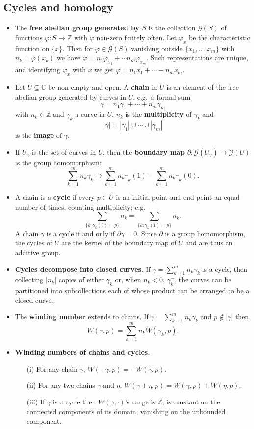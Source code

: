 \documentclass{article}
\newenvironment{topic}[1]{%
{\subsection{#1}}%
\begin{itemize}%
}{%
\end{itemize}%
}
\newcommand{\theorem}[1]{\item {\bf #1.}}
\newcommand{\term}[1]{{\bf #1}}
\newcommand{\remark}{\item}
\begin{document}
\begin{topic}{Cycles and homology}

\remark The \term{free abelian group generated by $S$} is the collection $\mathcal{G}(S)$ of functions $\varphi : S \to \mathbb{Z}$ with $\varphi$ non-zero finitely often. Let $\varphi_x$ be the characteristic function on $\{x\}$. Then for $\varphi \in \mathcal{G}(S)$ vanishing outside $\{x_1, \ldots, x_m\}$ with $n_k = \varphi(x_k)$ we have $\varphi = n_1 \varphi_{x_1} + \cdots n_m \varphi_{x_m}$. Such representations are unique, and identifying $\varphi_x$ with $x$ we get $\varphi = n_1 x_1 + \cdots + n_m x_m$.

\remark Let $U \subseteq \mathbb{C}$ be non-empty and open. A \term{chain} in $U$ is an element of the free abelian group generated by curves in $U$, e.g.\ a formal sum $$\gamma = n_1 \gamma_1 + \cdots + n_m \gamma_m$$ with $n_k \in \mathbb{Z}$ and $\gamma_k$ a curve in $U$. $n_k$ is the \term{multiplicity} of $\gamma_k$ and $$|\gamma| = |\gamma_1| \cup \cdots \cup |\gamma_m|$$ is the \term{image} of $\gamma$.

\remark If $U_\gamma$ is the set of curves in $U$, then the \term{boundary map} $\partial : \mathcal{G}(U_\gamma) \to \mathcal{G}(U)$ is the group homomorphism:
$$\sum_{k=1}^m n_k \gamma_k \mapsto \sum_{k=1}^m n_k \gamma_k(1) - \sum_{k=1}^m n_k \gamma_k(0).$$

\remark A chain is a \term{cycle} if every $p \in U$ is an initial point and end point an equal number of times, counting multiplicity; e.g. $$\sum_{\{k:\gamma_k(0)=p\}} n_k = \sum_{\{k:\gamma_k(1)=p\}} n_k.$$ A chain $\gamma$ is a cycle if and only if $\partial\gamma = 0$. Since $\partial$ is a group homomorphism, the cycles of $U$ are the kernel of the boundary map of $U$ and are thus an additive group.

\theorem{Cycles decompose into closed curves} If $\gamma = \sum_{k=1}^m n_k \gamma_k$ is a cycle, then collecting $|n_k|$ copies of either $\gamma_k$ or, when $n_k < 0$, $\gamma_k^-$, the curves can be partitioned into subcollections each of whose product can be arranged to be a closed curve.

\remark The \term{winding number} extends to chains. If $\gamma = \sum_{k=1}^m n_k \gamma_k$ and $p \not\in |\gamma|$ then $$W(\gamma, p) = \sum_{k=1}^m n_k W(\gamma_k, p).$$

\theorem{Winding numbers of chains and cycles} \begin{enumerate}
\item[(i)] For any chain $\gamma$, $W(-\gamma, p) = -W(\gamma, p)$.
\item[(ii)] For any two chains $\gamma$ and $\eta$, $W(\gamma + \eta, p) = W(\gamma, p) + W(\eta, p)$.
\item[(iii)] If $\gamma$ is a cycle then $W(\gamma, \cdot)$'s range is $\mathbb{Z}$, is constant on the connected components of its domain, vanishing on the unbounded component.
\end{enumerate}


\end{topic}
\end{document}
